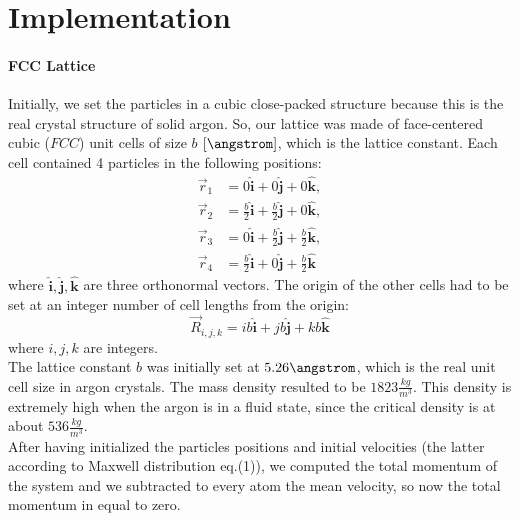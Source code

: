 \documentclass[10pt,a4paper,titlepage]{article}
\begin{document}
\section*{Implementation}
\noindent \paragraph{FCC Lattice} Initially, we set the particles in a cubic close-packed structure because this is the real crystal structure of solid argon. So, our lattice was made of face-centered cubic ($FCC$) unit cells of size $b$ $[\angstrom]$, which is the lattice constant. Each cell contained 4 particles in the following positions: 
\begin{equation}
\begin{split}
\vec r_1 &= 0 \hat{\textbf{i}} + 0 \hat{\textbf{j}} + 0 \hat{\textbf{k}},\\
	\vec r_2 &= \frac{b}{2}  \hat{\textbf{i}} + \frac{b}{2} \hat{\textbf{j}} + 0 \hat{\textbf{k}},\\
	\vec r_3 &= 0 \hat{\textbf{i}} + \frac{b}{2} \hat{\textbf{j}} + \frac{b}{2} \hat{\textbf{k}},\\
	\vec r_4 &= \frac{b}{2} \hat{\textbf{i}} + 0 \hat{\textbf{j}} + \frac{b}{2} \hat{\textbf{k}} 
    \end{split}
\end{equation}
where $\hat{\textbf{i}}, \hat{\textbf{j}}, \hat{\textbf{k}}$ are three orthonormal vectors. The origin of the other cells had to be set at an integer number of cell lengths from the origin:
\begin{equation}
\vec R_{i,j,k} = ib \hat{\textbf{i}} + jb \hat{\textbf{j}} + kb \hat{\textbf{k}}
\end{equation}
where $i,j,k$ are integers.
\\The lattice constant $b$ was initially set at $5.26 \angstrom$, which is the real unit cell size in argon crystals. The mass density resulted to be $1823 \frac{kg}{m^3}$. This density is extremely high when the argon is in a fluid state, since the critical density is at about $536 \frac{kg}{m^3}$.
\\After having initialized the particles positions and initial velocities (the latter according to Maxwell distribution eq.(1)), we computed the total momentum of the system and we subtracted to every atom the mean velocity, so now the total momentum in equal to zero.
\end{document}
